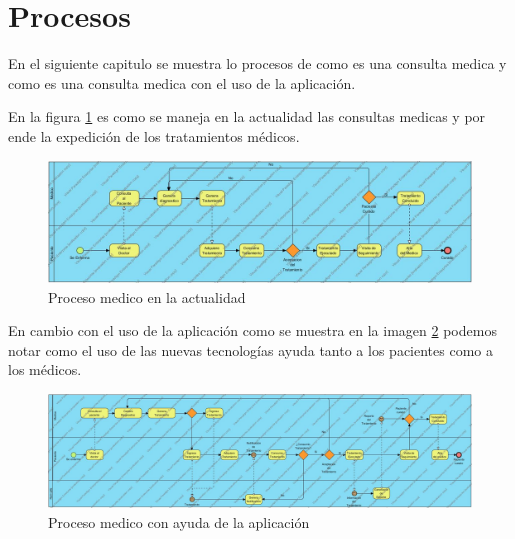 \section{Procesos}

En el siguiente capitulo se muestra lo procesos de como es una consulta medica y como es una consulta medica con el uso de la aplicación.


En la figura \ref{fig:proceso1} es como se maneja en la actualidad las consultas medicas y por ende la expedición de los tratamientos médicos.
\begin{figure}[htb]
	\centering
	\includegraphics[width=1.1\textwidth]{images/cap2/ProcesoMedico}
	\caption{Proceso medico en la actualidad} \label{fig:proceso1}
\end{figure}

En cambio con el uso de la aplicación como se muestra en la imagen \ref{fig:proceso2} podemos notar como el uso de las nuevas tecnologías ayuda tanto a los pacientes como a los médicos.

\begin{figure}[htb]
	\centering
	\includegraphics[width=1.1\textwidth]{images/cap2/RemPillstratamiento}
	\caption{Proceso medico con ayuda de la aplicación} \label{fig:proceso2}
\end{figure}


